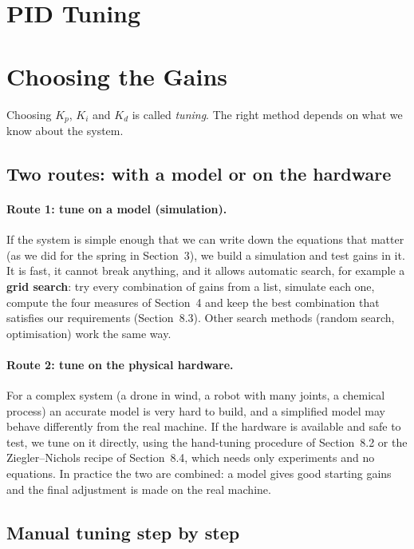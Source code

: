 \documentclass[]{article}
\begin{document}
\section{PID Tuning}


\section{Choosing the Gains}

Choosing $K_p$, $K_i$ and $K_d$ is called \emph{tuning}. The right method depends on what we know about the system.

\subsection{Two routes: with a model or on the hardware}

\paragraph{Route 1: tune on a model (simulation).}
If the system is simple enough that we can write down the equations that matter (as we did for the spring in Section~3), we build a simulation and test gains in it. It is fast, it cannot break anything, and it allows automatic search, for example a \textbf{grid search}: try every combination of gains from a list, simulate each one, compute the four measures of Section~4 and keep the best combination that satisfies our requirements (Section~8.3). Other search methods (random search, optimisation) work the same way.

\paragraph{Route 2: tune on the physical hardware.}
For a complex system (a drone in wind, a robot with many joints, a chemical process) an accurate model is very hard to build, and a simplified model may behave differently from the real machine. If the hardware is available and safe to test, we tune on it directly, using the hand-tuning procedure of Section~8.2 or the Ziegler--Nichols recipe of Section~8.4, which needs only experiments and no equations. In practice the two are combined: a model gives good starting gains and the final adjustment is made on the real machine.

\subsection{Manual tuning step by step}
\end{document}
